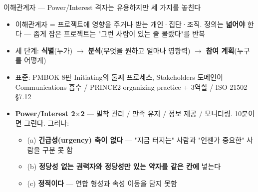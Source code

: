 \begin{frame}[allowframebreaks=1.0]{이해관계자 — Power/Interest 격자는 유용하지만 세 가지를 놓친다}
\small
\begin{itemize}
\item\relax 이해관계자 = 프로젝트에 영향을 주거나 받는 개인·집단·조직. 정의는 \textbf{넓어야} 한다 — 좁게 잡은 프로젝트는 "그런 사람이 있는 줄 몰랐다"를 반복
\item\relax 세 단계: \textbf{식별}(누가) $\rightarrow$ \textbf{분석}(무엇을 원하고 얼마나 영향력) $\rightarrow$ \textbf{참여 계획}(누구를 어떻게)
\item\relax 표준: PMBOK 8판 Initiating의 둘째 프로세스, Stakeholders 도메인이 Communications 흡수 / PRINCE2 organizing practice + 3역할 / ISO 21502 §7.12
\item\relax \textbf{Power/Interest 2$\times$2} — 밀착 관리 / 만족 유지 / 정보 제공 / 모니터링. 10분이면 그린다. 그러나:
\par\nobreak
\begin{itemize}
\item\relax (a) \textbf{긴급성(urgency) 축이 없다} — "지금 터지는" 사람과 "언젠가 중요한" 사람을 구분 못 함
\item\relax (b) \textbf{정당성 없는 권력자와 정당성만 있는 약자를 같은 칸에} 넣는다
\item\relax (c) \textbf{정적이다} — 연합 형성과 속성 이동을 담지 못함
\end{itemize}
\end{itemize}
\end{frame}

